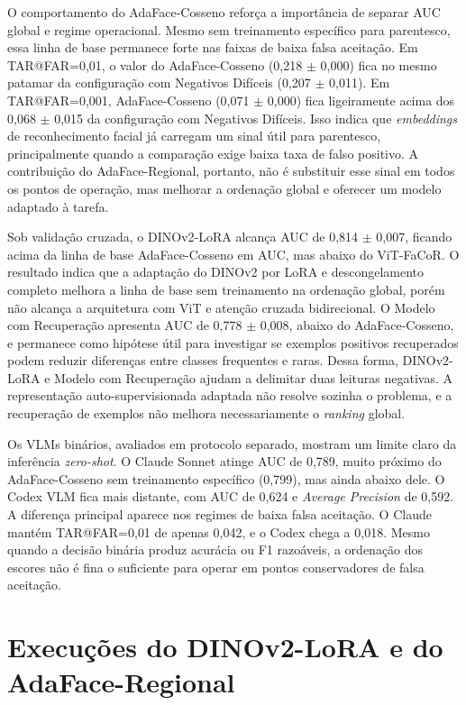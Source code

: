 O comportamento do AdaFace-Cosseno reforça a importância de separar AUC global e regime operacional. Mesmo sem treinamento específico para parentesco, essa linha de base permanece forte nas faixas de baixa falsa aceitação. Em TAR@FAR=0{,}01, o valor do AdaFace-Cosseno (0,218 $\pm$ 0,000) fica no mesmo patamar da configuração com Negativos Difíceis (0,207 $\pm$ 0,011). Em TAR@FAR=0{,}001, AdaFace-Cosseno (0,071 $\pm$ 0,000) fica ligeiramente acima dos 0,068 $\pm$ 0,015 da configuração com Negativos Difíceis. Isso indica que \textit{embeddings} de reconhecimento facial já carregam um sinal útil para parentesco, principalmente quando a comparação exige baixa taxa de falso positivo. A contribuição do AdaFace-Regional, portanto, não é substituir esse sinal em todos os pontos de operação, mas melhorar a ordenação global e oferecer um modelo adaptado à tarefa.

Sob validação cruzada, o DINOv2-LoRA alcança AUC de 0,814 $\pm$ 0,007, ficando acima da linha de base AdaFace-Cosseno em AUC, mas abaixo do ViT-FaCoR. O resultado indica que a adaptação do DINOv2 por LoRA e descongelamento completo melhora a linha de base sem treinamento na ordenação global, porém não alcança a arquitetura com ViT e atenção cruzada bidirecional. O Modelo com Recuperação apresenta AUC de 0,778 $\pm$ 0,008, abaixo do AdaFace-Cosseno, e permanece como hipótese útil para investigar se exemplos positivos recuperados podem reduzir diferenças entre classes frequentes e raras. Dessa forma, DINOv2-LoRA e Modelo com Recuperação ajudam a delimitar duas leituras negativas. A representação auto-supervisionada adaptada não resolve sozinha o problema, e a recuperação de exemplos não melhora necessariamente o \textit{ranking} global.

Os VLMs binários, avaliados em protocolo separado, mostram um limite claro da inferência \textit{zero-shot}. O Claude Sonnet atinge AUC de 0,789, muito próximo do AdaFace-Cosseno sem treinamento específico (0,799), mas ainda abaixo dele. O Codex VLM fica mais distante, com AUC de 0,624 e \textit{Average Precision} de 0,592. A diferença principal aparece nos regimes de baixa falsa aceitação. O Claude mantém TAR@FAR=0{,}01 de apenas 0,042, e o Codex chega a 0,018. Mesmo quando a decisão binária produz acurácia ou F1 razoáveis, a ordenação dos escores não é fina o suficiente para operar em pontos conservadores de falsa aceitação.

\section{Execuções do DINOv2-LoRA e do AdaFace-Regional}

